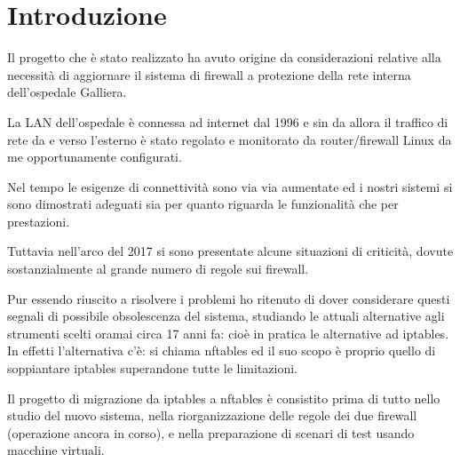 

\chapter{Introduzione} %

\label{Chapter1} %


\newcommand{\keyword}[1]{\textbf{#1}}
\newcommand{\tabhead}[1]{\textbf{#1}}
\newcommand{\code}[1]{\texttt{#1}}
\newcommand{\file}[1]{\texttt{\bfseries#1}}
\newcommand{\option}[1]{\texttt{\itshape#1}}


Il progetto che \`e stato realizzato ha avuto origine da considerazioni
relative alla necessit\`a di aggiornare il sistema di firewall a protezione
della rete interna dell'ospedale Galliera.

La LAN dell'ospedale \`e connessa ad internet dal 1996 e sin da allora il
traffico di rete da e verso l'esterno \`e stato regolato e monitorato da
router/firewall Linux da me opportunamente configurati.

Nel tempo le esigenze di connettivit\`a sono via via aumentate ed i nostri
sistemi si sono dimostrati adeguati sia per quanto riguarda le funzionalit\`a
che per prestazioni.

Tuttavia nell'arco del 2017 si sono presentate alcune situazioni di
criticit\`a, dovute sostanzialmente al grande numero di regole sui firewall.

Pur essendo riuscito a risolvere i problemi ho ritenuto di dover considerare
questi segnali di possibile obsolescenza del sistema, studiando le attuali
alternative agli strumenti scelti oramai circa 17 anni fa: cio\`e in pratica
le alternative ad iptables.  In effetti l'alternativa c'\`e: si chiama
nftables ed il suo scopo è proprio quello di soppiantare iptables
superandone tutte le limitazioni.

Il progetto di migrazione da iptables a nftables \`e consistito prima di
tutto nello studio del nuovo sistema, nella riorganizzazione delle regole dei
due firewall (operazione ancora in corso), e nella preparazione di scenari di
test usando macchine virtuali.

